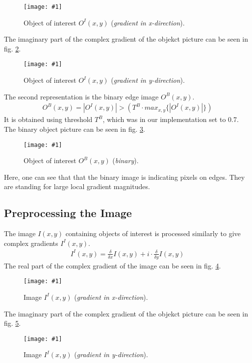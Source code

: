 \documentclass[a4paper,headings=small]{scrartcl}
\numberwithin{equation}{section} %
\numberwithin{figure}{section}   %
\newcommand{\image}[3]{
	\begin{figure}[htbp]
		\centering
		\texttt{[image: \#1]}
		\caption{#3}
		\label{fig:#1}
	\end{figure}
}
\newcommand{\generatedImgRoot}{../../../target}
\newcommand{\targetFlag}{test_} %
\newcommand{\templateThresh}{0.7} %
\begin{document}
\image{\generatedImgRoot/\targetFlag3_ObjectIreal.png}{0.4}{%
		Object of interest $O^I(x,y)$ (\emph{gradient in x-direction}).}

The imaginary part of the complex gradient of the objekct picture can be seen in 
fig. \ref{fig:\generatedImgRoot/\targetFlag4_ObjectIimag.png}.

\image{\generatedImgRoot/\targetFlag4_ObjectIimag.png}{0.4}{%
		Object of interest $O^I(x,y)$ (\emph{gradient in y-direction}).}
\pagebreak
The second representation is the binary edge image $O^B(x,y)$.
\begin{align}
O^B(x,y) = | O^I(x,y) | > ( T^B \cdot max_{x,y} \{| O^I(x,y) |\}) 
\end{align}
It is obtained using threshold $T^B$, which was in our implementation set to \templateThresh.
The binary object picture can be seen in fig. \ref{fig:\generatedImgRoot/\targetFlag5_ObjectB.png}.

\image{\generatedImgRoot/\targetFlag5_ObjectB.png}{0.3}{%
		Object of interest $O^B(x,y)$ (\emph{binary}).}

Here, one can see that that the binary image is indicating pixels on edges. 
They are standing for large local gradient magnitudes.
\subsection{Preprocessing the Image}

The image $I(x,y)$ containing objects of interest is processed similarly 
to give complex gradients $I^I(x,y)$.
\begin{align}
I^I(x,y) = \frac{\delta}{\delta x} I(x,y) + i \cdot \frac{\delta}{\delta y} I(x,y) 
\end{align}
The real part of the complex gradient of the image can be seen in 
fig. \ref{fig:\generatedImgRoot/\targetFlag6_ImageIreal.png}.

\image{\generatedImgRoot/\targetFlag6_ImageIreal.png}{0.5}{%
		Image $I^I(x,y)$ (\emph{gradient in x-direction}).}
\pagebreak
The imaginary part of the complex gradient of the objekct picture can be seen in 
fig. \ref{fig:\generatedImgRoot/\targetFlag7_ImageIimag.png}.

\image{\generatedImgRoot/\targetFlag7_ImageIimag.png}{0.5}{%
		Image $I^I(x,y)$ (\emph{gradient in y-direction}).}
\end{document}
